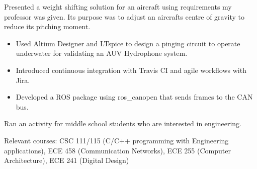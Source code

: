\documentclass[10pt,a4paper,ragged2e,withhyper]{altacv}
\begin{document}
\begin{paracol}{2}
Presented a weight shifting solution for an aircraft using requirements my professor was given. Its purpose was to adjust an aircrafts centre of gravity to reduce its pitching moment.

\switchcolumn

\begin{itemize}
\item Used Altium Designer and LTspice to design a pinging circuit to operate underwater for validating an AUV Hydrophone system.
\item Introduced continuous integration with Travis CI and agile workflows with Jira.
\item Developed a ROS package using ros\_canopen that sends frames to the CAN bus.
\end{itemize}

\divider\smallskip

Ran an activity for middle school students who are interested in engineering.


Relevant courses: CSC 111/115 (C/C++ programming with Engineering applications), ECE 458 (Communication Networks), ECE 255 (Computer Architecture), ECE 241 (Digital Design)


\divider


\end{paracol}
\end{document}
